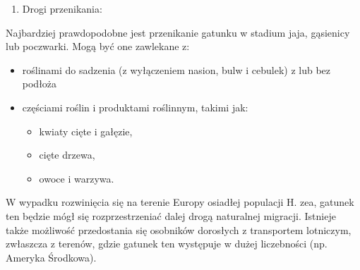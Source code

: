 \documentclass[polish,a4paper]{article}
\providecommand{\tightlist}{%
  \setlength{\itemsep}{0pt}\setlength{\parskip}{0pt}}
\begin{document}
\begin{enumerate}
\def\labelenumi{(\arabic{enumi})}
\setcounter{enumi}{7}
\tightlist
\item
  Drogi przenikania:
\end{enumerate}

Najbardziej prawdopodobne jest przenikanie gatunku w stadium jaja,
gąsienicy lub poczwarki. Mogą być one zawlekane z:

\begin{itemize}
\tightlist
\item
  roślinami do sadzenia (z wyłączeniem nasion, bulw i cebulek) z lub bez
  podłoża
\item
  częściami roślin i produktami roślinnym, takimi jak:

  \begin{itemize}
  \tightlist
  \item
    kwiaty cięte i gałęzie,
  \item
    cięte drzewa,
  \item
    owoce i warzywa.
  \end{itemize}
\end{itemize}

W wypadku rozwinięcia się na terenie Europy osiadłej populacji H. zea,
gatunek ten będzie mógł się rozprzestrzeniać dalej drogą naturalnej
migracji. Istnieje także możliwość przedostania się osobników dorosłych
z transportem lotniczym, zwłaszcza z terenów, gdzie gatunek ten
występuje w dużej liczebności (np. Ameryka Środkowa).
\end{document}
